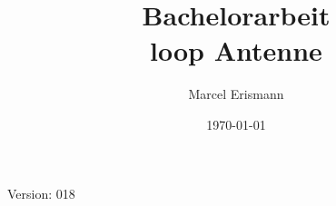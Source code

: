 \documentclass[10pt,a4paper]{article}
\author{Marcel Erismann}
\date{\today}
\title{Bachelorarbeit \\ \footnotesize{loop Antenne}}
\begin{document}
	
	Version: 018
	\tableofcontents 
	\newpage
	
\end{document}
